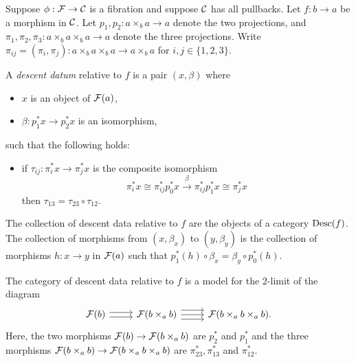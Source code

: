 \documentclass{amsart}
\begin{document}
\begin{definition} \label{def-descent-data}
    Suppose $\phi:\mathcal F\to \mathcal C$ is a fibration and suppose $\mathcal C$
        has all pullbacks.
    Let $f:b\to a$ be a morphism in $\mathcal C$.
    Let $p_1,p_2:a\times_b a \to a$ denote the two projections,
        and $\pi_1,\pi_2,\pi_3:a\times_b a\times_b a\to a$
        denote the three projections.
    Write $\pi_{ij}=(\pi_i,\pi_j):a\times_b a\times_b a\to a\times_b a$
        for $i,j\in \{1,2,3\}$.

    A \emph{descent datum} relative to $f$ is a pair $(x,\beta)$ where
    \begin{itemize}
        \item $x$ is an object of $\mathcal F(a)$,
        \item $\beta: p_1^\ast x\to p_2^\ast x$ is an isomorphism,
    \end{itemize}
        such that the following holds:
    \begin{itemize}
        \item if $\tau_{ij}:\pi_i^\ast x\to \pi_j^\ast x$ is
            the composite isomorphism
            \[
                \pi_i^\ast x \cong \pi_{ij}^\ast p_0^\ast x
                \xrightarrow{\beta} \pi_{ij}^\ast p_1^\ast x
                \cong \pi_j^\ast x
            \]
            then $\tau_{13}=\tau_{23}\circ \tau_{12}$.
    \end{itemize}

    The collection of descent data relative to $f$ are the objects of a category
        $\operatorname{Desc}(f)$.
    The collection of morphisms from $(x,\beta_x)$ to $(y,\beta_y)$ is
        the collection of morphisms
        $h:x\to y$ in $\mathcal F(a)$
        such that $p_1^\ast(h)\circ \beta_x=\beta_y\circ p_0^\ast(h)$.
\end{definition}
\begin{remark}
    The category of descent data relative to $f$ is a model for the
        $2$-limit
        of the diagram
    \[
        \begin{tikzcd}
            \mc F(b) \arrow[r,shift left] \arrow[r,shift right] & \mc F(b\times_a b)
            \arrow[r,shift left=2] \arrow[r] \arrow[r,shift right=2] & \mc F(b\times_a b\times_a b).
        \end{tikzcd}
    \]
    Here, the two morphisms $\mathcal F(b)\to \mathcal F(b\times_a b)$ are $p_2^\ast$ and $p_1^\ast$
        and the three morphisms $\mathcal F(b\times_a b)\to \mathcal F(b\times_a b\times_a b)$
        are $\pi_{23}^\ast,\pi_{13}^\ast$ and $\pi_{12}^\ast$.
\end{remark}
\end{document}
